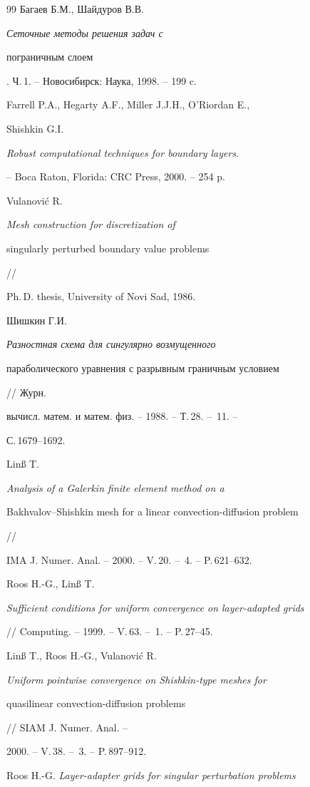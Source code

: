 \begin{thebibliography}{99}
{Багаев Б.М., Шайдуров В.В.} {\em Сеточные методы решения задач с


пограничным слоем}. Ч.\,1. -- Новосибирск: Наука, 1998. -- 199 c.




{Farrell P.A., Hegarty A.F., Miller J.J.H., O'Riordan E.,


Shishkin G.I.} {\em Robust computational techniques for boundary layers}.


-- Boca Raton, Florida: CRC Press, 2000. -- 254 p.




{Vulanovi\'c R.} {\em Mesh construction for discretization of


singularly perturbed boundary value problems} //


Ph.\,D. thesis, University of Novi Sad, 1986.




{Шишкин Г.И.} {\em Разностная схема для сингулярно возмущенного


параболического уравнения с разрывным граничным условием} // Журн.


вычисл. матем. и матем. физ. -- 1988. -- Т.\,28. -- \No\,11. --


С.\,1679--1692.




{Lin\ss{} T.} {\em Analysis of a Galerkin finite element method on a


Bakhvalov--Shishkin mesh for a linear convection-diffusion problem} //


IMA J. Numer. Anal. -- 2000. -- V.\,20. -- \No\,4. -- P.\,621--632.




{Roos H.-G., Lin\ss{} T.}


{\em Sufficient conditions for uniform convergence on layer-adapted grids}


// Computing. -- 1999. -- V.\,63. -- \No\,1. -- P.\,27--45.




{Lin\ss{} T., Roos H.-G., Vulanovi\'c R.}


{\em Uniform pointwise convergence on Shishkin-type meshes for


quasilinear convection-diffusion problems} // SIAM J. Numer. Anal. --


2000. -- V.\,38. -- \No\,3. -- P.\,897--912.




{Roos H.-G.} {\em Layer-adapter grids for singular perturbation problems}



\end{thebibliography}
